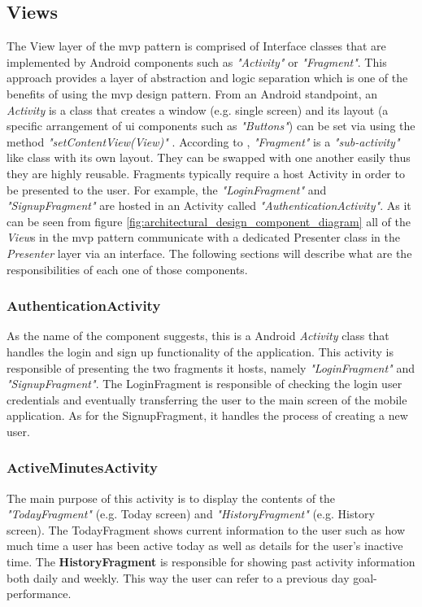         \subsection{Views}
        The View layer of the \gls{mvp} pattern is comprised of Interface classes that are implemented by Android components such as \textit{"Activity"} or \textit{"Fragment"}. This approach provides a layer of abstraction and logic separation which is one of the benefits of using the \gls{mvp} design pattern. From an Android standpoint, an \textit{Activity} is a class that creates a window (e.g. single screen) and its layout (a specific arrangement of \gls{ui} components such as \textit{"Buttons"}) can be set via using the method \textit{"setContentView(View)"} \citep{googleactivity2017}. According to \citet{googlefragments2017}, \textit{"Fragment"} is a \textit{"sub-activity"} like class with its own layout. They can be swapped with one another easily thus they are highly reusable. Fragments typically require a host Activity in order to be presented to the user. For example, the \textit{"LoginFragment"} and \textit{"SignupFragment"} are hosted in an Activity called \textit{"AuthenticationActivity"}. As it can be seen from figure \ref{fig:architectural_design_component_diagram} all of the \textit{View}s in the \gls{mvp} pattern communicate with a dedicated Presenter class in the \textit{Presenter} layer via an interface. The following sections will describe what are the responsibilities of each one of those components.
            
            \subsubsection{AuthenticationActivity}
            As the name of the component suggests, this is a Android \textit{Activity} class that handles the login and sign up functionality of the application. This activity is responsible of presenting the two fragments it hosts, namely \textit{"LoginFragment"} and \textit{"SignupFragment"}. The LoginFragment is responsible of checking the login user credentials and eventually transferring the user to the main screen of the mobile application. As for the SignupFragment, it handles the process of creating a new user.
            
            \subsubsection{ActiveMinutesActivity}
            The main purpose of this activity is to display the contents of the \textit{"TodayFragment"} (e.g. Today screen) and \textit{"HistoryFragment"} (e.g. History screen). The TodayFragment shows current information to the user such as how much time a user has been active today as well as details for the user's inactive time. The \textbf{HistoryFragment} is responsible for showing past activity information both daily and weekly. This way the user can refer to a previous day goal-performance.
            
